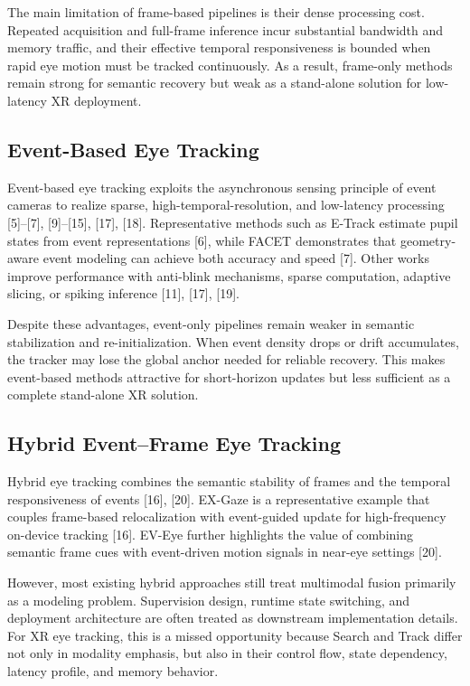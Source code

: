 \documentclass[journal]{IEEEtran}
\begin{document}
The main limitation of frame-based pipelines is their dense processing cost. Repeated acquisition and full-frame inference incur substantial bandwidth and memory traffic, and their effective temporal responsiveness is bounded when rapid eye motion must be tracked continuously. As a result, frame-only methods remain strong for semantic recovery but weak as a stand-alone solution for low-latency XR deployment.

\subsection{Event-Based Eye Tracking}
Event-based eye tracking exploits the asynchronous sensing principle of event cameras to realize sparse, high-temporal-resolution, and low-latency processing [5]--[7], [9]--[15], [17], [18]. Representative methods such as E-Track estimate pupil states from event representations [6], while FACET demonstrates that geometry-aware event modeling can achieve both accuracy and speed [7]. Other works improve performance with anti-blink mechanisms, sparse computation, adaptive slicing, or spiking inference [11], [17], [19].

Despite these advantages, event-only pipelines remain weaker in semantic stabilization and re-initialization. When event density drops or drift accumulates, the tracker may lose the global anchor needed for reliable recovery. This makes event-based methods attractive for short-horizon updates but less sufficient as a complete stand-alone XR solution.

\subsection{Hybrid Event--Frame Eye Tracking}
Hybrid eye tracking combines the semantic stability of frames and the temporal responsiveness of events [16], [20]. EX-Gaze is a representative example that couples frame-based relocalization with event-guided update for high-frequency on-device tracking [16]. EV-Eye further highlights the value of combining semantic frame cues with event-driven motion signals in near-eye settings [20].

However, most existing hybrid approaches still treat multimodal fusion primarily as a modeling problem. Supervision design, runtime state switching, and deployment architecture are often treated as downstream implementation details. For XR eye tracking, this is a missed opportunity because Search and Track differ not only in modality emphasis, but also in their control flow, state dependency, latency profile, and memory behavior.
\end{document}
